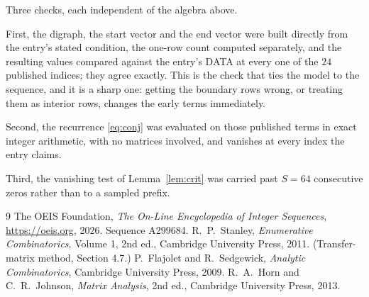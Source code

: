 \documentclass[11pt,a4paper]{article}
\theoremstyle{plain}
\theoremstyle{definition}
\begin{document}
Three checks, each independent of the algebra above.

First, the digraph, the start vector and the end vector were built directly from the
entry's stated condition, the one-row count computed separately, and the resulting values
compared against the entry's DATA at every one of the $24$ published indices; they
agree exactly. This is the check that ties the model to the sequence, and it is a sharp one:
getting the boundary rows wrong, or treating them as interior rows, changes the early terms
immediately.

Second, the recurrence \eqref{eq:conj} was evaluated on those published terms in exact
integer arithmetic, with no matrices involved, and vanishes at every index the entry claims.

Third, the vanishing test of Lemma~\ref{lem:crit} was carried past $S=64$ consecutive
zeros rather than to a sampled prefix.

\begin{thebibliography}{9}
 The OEIS Foundation, \emph{The On-Line Encyclopedia of Integer
Sequences}, \url{https://oeis.org}, 2026. Sequence A299684.
 R.~P.~Stanley, \emph{Enumerative Combinatorics}, Volume 1, 2nd ed.,
Cambridge University Press, 2011. (Transfer-matrix method, Section 4.7.)
 P.~Flajolet and R.~Sedgewick, \emph{Analytic Combinatorics}, Cambridge
University Press, 2009.
 R.~A.~Horn and C.~R.~Johnson, \emph{Matrix Analysis}, 2nd ed., Cambridge
University Press, 2013.
\end{thebibliography}
\end{document}
